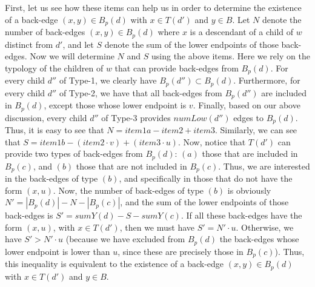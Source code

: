 \documentclass[11pt,a4paper]{article}
\begin{document}
First, let us see how these items can help us in order to determine the existence of a back-edge $(x,y)\in B_p(d)$ with $x\in T(d')$ and $y\in B$. Let $N$ denote the number of back-edges $(x,y)\in B_p(d)$ where $x$ is a descendant of a child of $w$ distinct from $d'$, and let $S$ denote the sum of the lower endpoints of those back-edges. Now we will determine $N$ and $S$ using the above items. Here we rely on the typology of the children of $w$ that can provide back-edges from $B_p(d)$. For every child $d''$ of Type-1, we clearly have $B_p(d'')\subset B_p(d)$. Furthermore, for every child $d''$ of Type-2, we have that all back-edges from $B_p(d'')$ are included in $B_p(d)$, except those whose lower endpoint is $v$. Finally, based on our above discussion, every child $d''$ of Type-3 provides $\mathit{numLow}(d'')$ edges to $B_p(d)$. Thus, it is easy to see that $N=\mathit{item1a}-\mathit{item2}+\mathit{item3}$. Similarly, we can see that $S=\mathit{item1b}-(\mathit{item2}\cdot v)+(\mathit{item3}\cdot u)$. Now, notice that $T(d')$ can provide two types of back-edges from $B_p(d)$: $(a)$ those that are included in $B_p(c)$, and $(b)$ those that are not included in $B_p(c)$. Thus, we are interested in the back-edges of type $(b)$, and specifically in those that do not have the form $(x,u)$. Now, the number of back-edges of type $(b)$ is obviously $N'=|B_p(d)|-N-|B_p(c)|$, and the sum of the lower endpoints of those back-edges is $S'=\mathit{sumY}(d)-S-\mathit{sumY}(c)$. If all these back-edges have the form $(x,u)$, with $x\in T(d')$, then we must have $S'=N'\cdot u$. Otherwise, we have $S'>N'\cdot u$ (because we have excluded from $B_p(d)$ the back-edges whose lower endpoint is lower than $u$, since these are precisely those in $B_p(c)$). Thus, this inequality is equivalent to the existence of a back-edge $(x,y)\in B_p(d)$ with $x\in T(d')$ and $y\in B$.
\end{document}
